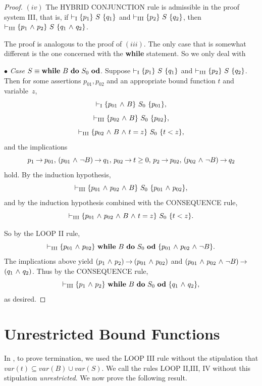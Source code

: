 \documentclass[runningheads]{llncs}       %
\begin{document}
\begin{proof}
\NI
$(iv)$ The {\rm HYBRID CONJUNCTION} rule is admissible in the proof system {\rm III},
that is,
if $\vdash_{\rm{I}} \mbox{$\{{p_1}\}\ {S}\ \{{q_1}\}$}$ and $\vdash_{\rm{III}} \mbox{$\{{p_2}\}\ {S}\ \{{q_2}\}$}$, then
$\vdash_{\rm{III}} \mbox{$\{{p_1 \mbox{$\ \wedge\ $} p_2}\}\ {S}\ \{{q_1 \mbox{$\ \wedge\ $} q_2}\}$}$.

The proof is analogous to the proof of $(iii)$. 
The only case that is somewhat different is the one
concerned with the \textbf{while} statement. 
So we only deal with
\vspace{2mm}

\NI
$\bullet$ \emph{Case} $S \equiv \mbox{$\mbox{{\bf while}\ } {B}\ \mbox{{\bf do}\ } {S_0}\ \mbox{{\bf od}}$}$.
Suppose $\vdash_{\rm{I}} \mbox{$\{{p_1}\}\ {S}\ \{{q_1}\}$}$ and
$\vdash_{\rm{III}} \mbox{$\{{p_2}\}\ {S}\ \{{q_2}\}$}$.
Then for some assertions $p_{01},p_{02}$ and an appropriate bound function $t$ and
variable~$z$,
\[
 \vdash_{\rm{I}} \mbox{$\{{p_{01} \mbox{$\ \wedge\ $} B}\}\ {S_0}\ \{{p_{01}}\}$},
\]
\[
 \vdash_{\rm{III}} \mbox{$\{{p_{02} \mbox{$\ \wedge\ $} B}\}\ {S_0}\ \{{p_{02}}\}$},
\]
\[
 \vdash_{\rm{III}} \mbox{$\{{p_{02} \mbox{$\ \wedge\ $} B \mbox{$\ \wedge\ $} t = z}\}\ {S_0}\ \{{t < z}\}$},
\]
and the implications
\[
  p_1 \mbox{$\:\rightarrow\:$} p_{01}, \, (p_{01} \mbox{$\ \wedge\ $} \neg B) \mbox{$\:\rightarrow\:$} q_1, \,
  p_{02} \mbox{$\:\rightarrow\:$} t \ge 0, \, p_2 \mbox{$\:\rightarrow\:$} p_{02}, \, (p_{02} \mbox{$\ \wedge\ $} \neg B) \mbox{$\:\rightarrow\:$} q_2
\]
hold. By the induction hypothesis,
\[
 \vdash_{\rm{III}} \mbox{$\{{p_{01} \mbox{$\ \wedge\ $} p_{02} \mbox{$\ \wedge\ $} B}\}\ {S_0}\ \{{p_{01} \mbox{$\ \wedge\ $} p_{02}}\}$},
\]
and by the induction hypothesis combined with the CONSEQUENCE rule,
\[
 \vdash_{\rm{III}} \mbox{$\{{p_{01} \mbox{$\ \wedge\ $} p_{02} \mbox{$\ \wedge\ $} B \mbox{$\ \wedge\ $} t = z}\}\ {S_0}\ \{{t < z}\}$}.
\]

So by the LOOP II rule,
\[
  \vdash_{\rm{III}} \mbox{$\{{p_{01} \mbox{$\ \wedge\ $} p_{02}}\}\ {\mbox{$\mbox{{\bf while}\ } {B}\ \mbox{{\bf do}\ } {S_0}\ \mbox{{\bf od}}$}}\ \{{p_{01} \mbox{$\ \wedge\ $} p_{02} \mbox{$\ \wedge\ $} \neg B}\}$}.
\]
The implications above yield
$(p_1 \mbox{$\ \wedge\ $} p_2) \mbox{$\:\rightarrow\:$} (p_{01} \mbox{$\ \wedge\ $} p_{02})$ and
$(p_{01} \mbox{$\ \wedge\ $} p_{02} \mbox{$\ \wedge\ $} \neg B) \mbox{$\:\rightarrow\:$}$ $(q_1 \mbox{$\ \wedge\ $} q_2)$.
Thus by the CONSEQUENCE rule,
\[
 \vdash_{\rm{III}} \mbox{$\{{p_1 \mbox{$\ \wedge\ $} p_2}\}\ {\mbox{$\mbox{{\bf while}\ } {B}\ \mbox{{\bf do}\ } {S_0}\ \mbox{{\bf od}}$}}\ \{{q_1 \mbox{$\ \wedge\ $} q_2}\}$},
\]
as desired.
\HB

\end{proof}



\section{Unrestricted Bound Functions} \label{LOOPIIt}
In \cite{ABO09}, to prove termination, we used the LOOP III rule
without the stipulation that $var(t) \subseteq var(B) \cup var(S)$.
We call the rules LOOP II,III, IV without this stipulation \emph{unrestricted}.
We now prove the following result.
\end{document}
